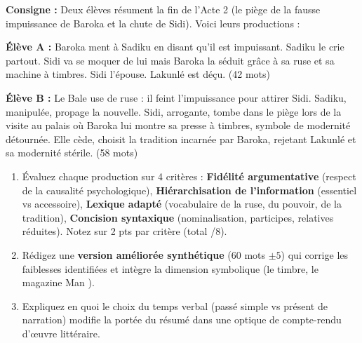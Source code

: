 \documentclass[11pt]{article}
\begin{document}
\begin{exercice}
\textbf{Consigne :} Deux élèves résument la fin de l'Acte 2 (le piège de la fausse impuissance de Baroka et la chute de Sidi). Voici leurs productions :

\textbf{Élève A :} \og Baroka ment à Sadiku en disant qu'il est impuissant. Sadiku le crie partout. Sidi va se moquer de lui mais Baroka la séduit grâce à sa ruse et sa machine à timbres. Sidi l'épouse. Lakunlé est déçu. \fg{} (42 mots)

\textbf{Élève B :} \og Le Bale use de ruse : il feint l'impuissance pour attirer Sidi. Sadiku, manipulée, propage la nouvelle. Sidi, arrogante, tombe dans le piège lors de la visite au palais où Baroka lui montre sa presse à timbres, symbole de modernité détournée. Elle cède, choisit la tradition incarnée par Baroka, rejetant Lakunlé et sa modernité stérile. \fg{} (58 mots)

\begin{enumerate}
    \item Évaluez chaque production sur 4 critères : \textbf{Fidélité argumentative} (respect de la causalité psychologique), \textbf{Hiérarchisation de l'information} (essentiel vs accessoire), \textbf{Lexique adapté} (vocabulaire de la ruse, du pouvoir, de la tradition), \textbf{Concision syntaxique} (nominalisation, participes, relatives réduites). Notez sur 2 pts par critère (total /8).
    \item Rédigez une \textbf{version améliorée synthétique} (60 mots $\pm 5$) qui corrige les faiblesses identifiées et intègre la dimension symbolique (le timbre, le magazine \og Man \fg{}).
    \item Expliquez en quoi le choix du temps verbal (passé simple vs présent de narration) modifie la portée du résumé dans une optique de compte-rendu d'œuvre littéraire.
\end{enumerate}
\end{exercice}
\end{document}

